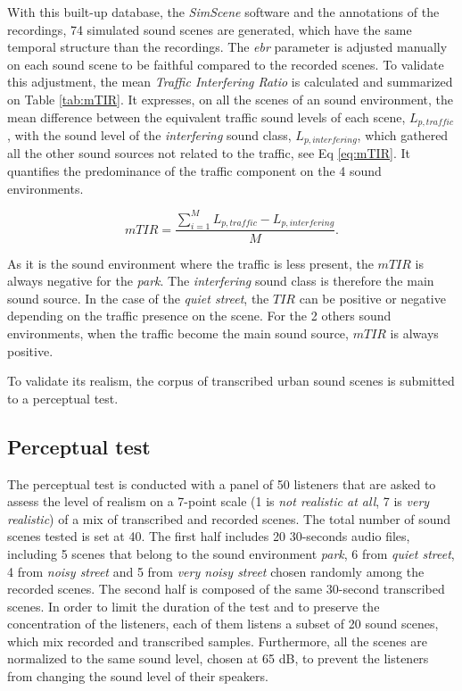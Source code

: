 \documentclass[review,5p,twocolumn,sort&compress,times]{elsarticle}
\begin{document}
With this built-up database, the \textit{SimScene} software and the annotations of the recordings, 74 simulated sound scenes are generated, which have the same temporal structure than the recordings. The \textit{ebr} parameter is adjusted manually on each sound scene to be faithful compared to the recorded scenes. To validate this adjustment, the mean \textit{Traffic Interfering Ratio} is calculated and summarized on Table \ref{tab:mTIR}. It expresses, on all the scenes of an sound environment, the mean difference between the equivalent traffic sound levels of each scene, $L_{p,traffic}$, with the sound level of the \textit{interfering} sound class, $L_{p, interfering}$, which gathered all the other sound sources not related to the traffic, see Eq \ref{eq:mTIR}. It quantifies the predominance of the traffic component on the 4 sound environments.

\begin{equation}\label{eq:mTIR}
mTIR = \frac{\sum_{i = 1}^M L_{p,traffic} - L_{p, interfering}}{M}.
\end{equation}

As it is the sound environment where the traffic is less present, the $mTIR$ is always negative for the \textit{park}. The \textit{interfering} sound class is therefore the main sound source. In the case of the \textit{quiet street}, the $TIR$ can be positive or negative depending on the traffic presence on the scene. For the 2 others sound environments, when the traffic become the main sound source, $mTIR$ is always positive.

To validate its realism, the corpus of transcribed urban sound scenes is submitted to a perceptual test.

\subsection{Perceptual test}
The perceptual test is conducted with a panel of 50 listeners that are asked to assess the level of realism on a 7-point scale (1 is \textit{not realistic at all}, 7 is \textit{very realistic}) of a mix of transcribed and recorded scenes. The total number of sound scenes tested is set at 40. The first half includes 20 30-seconds audio files, including 5 scenes that belong to the sound environment \textit{park}, 6 from \textit{quiet street}, 4 from \textit{noisy street} and 5 from \textit{very noisy street} chosen randomly among the recorded scenes. The second half is composed of the same 30-second transcribed scenes. In order to limit the duration of the test and to preserve the concentration of the listeners, each of them listens a subset of 20 sound scenes, which mix recorded and transcribed samples. Furthermore, all the scenes are normalized to the same sound level, chosen at 65 dB, to prevent the listeners from changing the sound level of their speakers.
\end{document}
